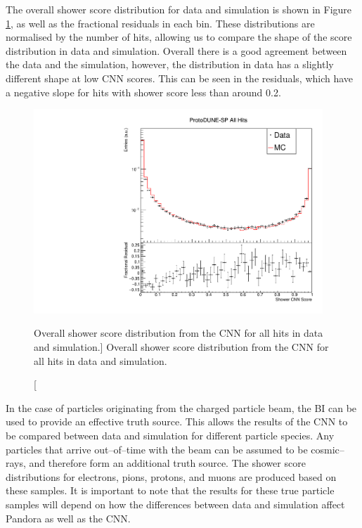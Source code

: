 The overall shower score distribution for data and simulation is shown in 
Figure \ref{fig:cnn_overall_score}, as well as the fractional residuals in 
each bin. These distributions are normalised by the number of hits, allowing us
to compare the shape of the score distribution in data and simulation.  
Overall there is a good agreement between the data and the simulation, 
however, the distribution in data has a slightly different shape at low CNN
scores. This can be seen in the residuals, which have a negative slope for 
hits with shower score less than around 0.2.
\begin{figure}
	\centering
	\includegraphics[width=0.97\textwidth]{figures/hit_cnn_all.pdf}
	\caption
	[Overall shower score distribution from the CNN for all hits in data and simulation.]
	{Overall shower score distribution from the CNN for all hits in data and simulation.}
	\label{fig:cnn_overall_score}
\end{figure}

In the case of particles originating from the charged particle beam, the BI can
be used to provide an effective truth source. This allows the results of the CNN
to be compared between data and simulation for different particle species. Any 
particles that arrive out--of--time with the beam can be assumed to be 
cosmic--rays, and therefore form an additional truth source. The shower score 
distributions for electrons, pions, protons, and muons are produced based on 
these samples. It is important to note that the results for these true 
particle samples will depend on how the differences between data and 
simulation affect Pandora as well as the CNN.

